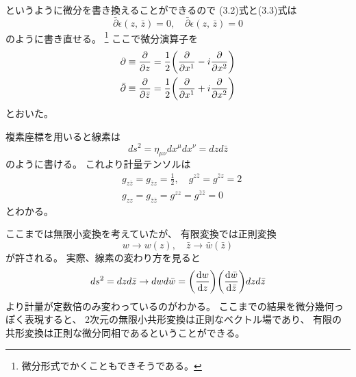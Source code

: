 \documentclass[../../master.tex]{subfiles}
\begin{document}
というように微分を書き換えることができるので
(3.2)式と(3.3)式は
\begin{equation}
    \bar{\partial}\epsilon(z,\,\bar{z}) = 0,\quad \bar{\partial}\epsilon(z,\,\bar{z})=0
\end{equation}
のように書き直せる。
\footnote{微分形式でかくこともできそうである。}%
ここで微分演算子を
\begin{align}
    \partial \equiv \pdv{z} &= \frac{1}{2}\qty(\pdv{x^1}-i\pdv{x^2})\\
    \bar{\partial} \equiv \pdv{\bar{z}} &= \frac{1}{2}\qty(\pdv{x^1}+i\pdv{x^2})
\end{align}
とおいた。

複素座標を用いると線素は
\begin{equation}
    ds^2 = \eta_{\mu\nu}dx^\mu dx^\nu = dz d\bar{z}
\end{equation}
のように書ける。
これより計量テンソルは
\begin{equation}
    \begin{split}
        &g_{z\bar{z}} = g_{\bar{z}z} = \frac{1}{2},\quad g^{z\bar{z}} = g^{\bar{z} z} = 2\\
        &g_{zz} = g_{\bar{z}\bar{z}} = g^{zz} = g^{\bar{z}\bar{z}} =0
    \end{split}
\end{equation}
とわかる。

ここまでは無限小変換を考えていたが、
有限変換では正則変換
\begin{equation}
    w\rightarrow w(z),\quad \bar{z} \rightarrow \bar{w}(\bar{z})
\end{equation}
が許される。
実際、線素の変わり方を見ると
\begin{equation}
    ds^2 = dz d\bar{z} \rightarrow dw d\bar{w} = \qty(\dv{w}{z})\qty(\dv{\bar{w}}{\bar{z}})dz d\bar{z}
\end{equation}
より計量が定数倍のみ変わっているのがわかる。
ここまでの結果を微分幾何っぽく表現すると、
2次元の無限小共形変換は正則なベクトル場であり、
有限の共形変換は正則な微分同相であるということができる。
\end{document}
